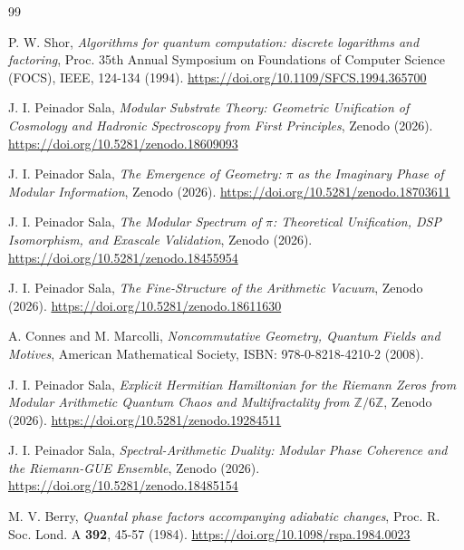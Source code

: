 \documentclass[12pt,a4paper]{article}
\theoremstyle{plain}
\theoremstyle{definition}
\theoremstyle{remark}
\begin{document}
\begin{thebibliography}{99}

P. W. Shor, \textit{Algorithms for quantum computation: discrete logarithms and factoring}, Proc. 35th Annual Symposium on Foundations of Computer Science (FOCS), IEEE, 124-134 (1994). \url{https://doi.org/10.1109/SFCS.1994.365700}

J. I. Peinador Sala, \textit{Modular Substrate Theory: Geometric Unification of Cosmology and Hadronic Spectroscopy from First Principles}, Zenodo (2026). \url{https://doi.org/10.5281/zenodo.18609093}

J. I. Peinador Sala, \textit{The Emergence of Geometry: $\pi$ as the Imaginary Phase of Modular Information}, Zenodo (2026). \url{https://doi.org/10.5281/zenodo.18703611}

J. I. Peinador Sala, \textit{The Modular Spectrum of $\pi$: Theoretical Unification, DSP Isomorphism, and Exascale Validation}, Zenodo (2026). \url{https://doi.org/10.5281/zenodo.18455954}

J. I. Peinador Sala, \textit{The Fine-Structure of the Arithmetic Vacuum}, Zenodo (2026). \url{https://doi.org/10.5281/zenodo.18611630}

A. Connes and M. Marcolli, \textit{Noncommutative Geometry, Quantum Fields and Motives}, American Mathematical Society, ISBN: 978-0-8218-4210-2 (2008).

J. I. Peinador Sala, \textit{Explicit Hermitian Hamiltonian for the Riemann Zeros from Modular Arithmetic Quantum Chaos and Multifractality from $\mathbb{Z}/6\mathbb{Z}$}, Zenodo (2026). \url{https://doi.org/10.5281/zenodo.19284511}

J. I. Peinador Sala, \textit{Spectral-Arithmetic Duality: Modular Phase Coherence and the Riemann-GUE Ensemble}, Zenodo (2026). \url{https://doi.org/10.5281/zenodo.18485154}

M. V. Berry, \textit{Quantal phase factors accompanying adiabatic changes}, Proc. R. Soc. Lond. A \textbf{392}, 45-57 (1984). \url{https://doi.org/10.1098/rspa.1984.0023}


\end{thebibliography}
\end{document}
